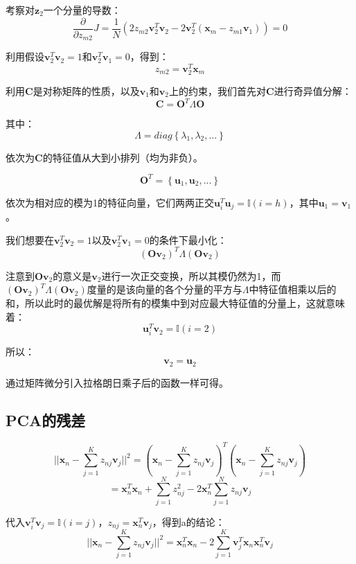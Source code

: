 \documentclass[UTF8]{ctexart}
\begin{document}
考察对$\textbf{z}_{2}$一个分量的导数：
$$\frac{\partial}{\partial z_{m2}}J = \frac{1}{N}(2z_{m2}\textbf{v}_{2}^{T}\textbf{v}_{2}-2\textbf{v}_{2}^{T}(\textbf{x}_{m}-z_{m1}\textbf{v}_{1}))=0$$

利用假设$\textbf{v}_{2}^{T}\textbf{v}_{2}=1$和$\textbf{v}_{2}^{T}\textbf{v}_{1}=0$，得到：
$$z_{m2}=\textbf{v}_{2}^{T}\textbf{x}_{m}$$

利用$\textbf{C}$是对称矩阵的性质，以及$\textbf{v}_{1}$和$\textbf{v}_{2}$上的约束，我们首先对$\textbf{C}$进行奇异值分解：
$$\textbf{C}=\textbf{O}^{T}\Lambda\textbf{O}$$

其中：
$$\Lambda = diag\left\{ \lambda_{1},\lambda_{2},... \right\}$$

依次为$\textbf{C}$的特征值从大到小排列（均为非负）。

$$\textbf{O}^{T}=\left\{ \textbf{u}_{1},\textbf{u}_{2},... \right\}$$

依次为相对应的模为1的特征向量，它们两两正交$\textbf{u}_{i}^{T}\textbf{u}_{j}=\mathbb{I}(i=h)$，其中$\textbf{u}_{1}=\textbf{v}_{1}$。

我们想要在$\textbf{v}_{2}^{T}\textbf{v}_{2}=1$以及$\textbf{v}_{2}^{T}\textbf{v}_{1}=0$的条件下最小化：
$$(\textbf{O}\textbf{v}_{2})^{T}\Lambda(\textbf{O}\textbf{v}_{2})$$

注意到$\textbf{O}\textbf{v}_{2}$的意义是$\textbf{v}_{2}$进行一次正交变换，所以其模仍然为1，而$(\textbf{O}\textbf{v}_{2})^{T}\Lambda(\textbf{O}\textbf{v}_{2})$度量的是该向量的各个分量的平方与$\Lambda$中特征值相乘以后的和，所以此时的最优解是将所有的模集中到对应最大特征值的分量上，这就意味着：
$$\textbf{u}_{i}^{T}\textbf{v}_{2} = \mathbb{I}(i=2)$$

所以：
$$\textbf{v}_{2}=\textbf{u}_{2}$$

通过矩阵微分引入拉格朗日乘子后的函数一样可得。

\subsection{PCA的残差}
$$||\textbf{x}_{n}-\sum_{j=1}^{K}z_{nj}\textbf{v}_{j}||^{2}=(\textbf{x}_{n}-\sum_{j=1}^{K}z_{nj}\textbf{v}_{j})^{T}(\textbf{x}_{n}-\sum_{j=1}^{K}z_{nj}\textbf{v}_{j})$$
$$=\textbf{x}_{n}^{T}\textbf{x}_{n}+\sum_{j=1}^{N}z_{nj}^{2} - 2\textbf{x}_{n}^{T}\sum_{j=1}^{N}z_{nj}\textbf{v}_{j}$$

代入$\textbf{v}_{i}^{T}\textbf{v}_{j}=\mathbb{I}(i=j)$，$z_{nj}=\textbf{x}_{n}^{T}\textbf{v}_{j}$，得到a的结论：
$$||\textbf{x}_{n}-\sum_{j=1}^{K}z_{nj}\textbf{v}_{j}||^{2}=\textbf{x}_{n}^{T}\textbf{x}_{n} - 2\sum_{j=1}^{K}\textbf{v}_{j}^{T}\textbf{x}_{n}\textbf{x}_{n}^{T}\textbf{v}_{j}$$
\end{document}
